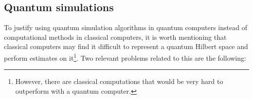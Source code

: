 \documentclass[a4paper]{report}
\begin{document}
\begin{spacing}{1.1}








\section{Quantum simulations}


To justify using quantum simulation algorithms in quantum computers instead of computational methods in classical computers, it is worth mentioning that classical computers may find it difficult to represent a quantum Hilbert space and perform estimates on it\footnote{However, there are classical computations that would be very hard to outperform with a quantum computer.}. Two relevant problems related to this are the following:


\end{spacing}
\end{document}
